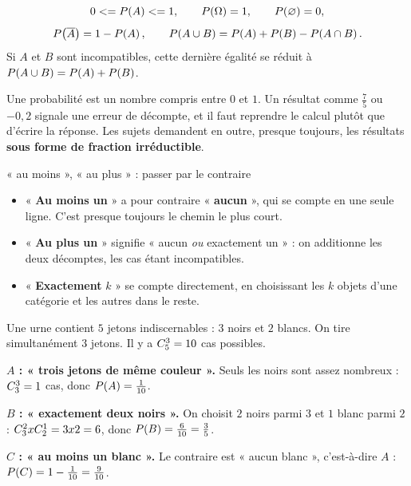 \begin{propriete}
\[
  0 \leq \proba{A} \leq 1, \qquad \proba{\Omega} = 1, \qquad
  \proba{\varnothing} = 0,
\]
\[
  \proba{\evtc{A}} = 1-\proba{A}, \qquad
  \proba{A \cup B} = \proba{A}+\proba{B}-\proba{A \cap B} .
\]
Si $A$ et $B$ sont incompatibles, cette dernière égalité se réduit à
$\proba{A \cup B} = \proba{A}+\proba{B}$.
\end{propriete}

\begin{avertissement}
Une probabilité est un nombre compris entre $0$ et $1$. Un résultat comme
$\frac{7}{5}$ ou $-0{,}2$ signale une erreur de décompte, et il faut
reprendre le calcul plutôt que d'écrire la réponse. Les sujets demandent en
outre, presque toujours, les résultats \textbf{sous forme de fraction
irréductible}.
\end{avertissement}

\begin{methode}{« au moins », « au plus » : passer par le contraire}
\begin{itemize}[leftmargin=1.3em, itemsep=0.2em]
  \item « \textbf{Au moins un} » a pour contraire « \textbf{aucun} », qui se
        compte en une seule ligne. C'est presque toujours le chemin le plus
        court.
  \item « \textbf{Au plus un} » signifie « aucun \emph{ou} exactement un » :
        on additionne les deux décomptes, les cas étant incompatibles.
  \item « \textbf{Exactement} $k$ » se compte directement, en choisissant
        les $k$ objets d'une catégorie et les autres dans le reste.
\end{itemize}
\end{methode}

\begin{exemple}
Une urne contient $5$ jetons indiscernables : $3$ noirs et $2$ blancs. On
tire simultanément $3$ jetons. Il y a $\combi{3}{5} = 10$ cas possibles.

\textbf{$A$ : « trois jetons de même couleur ».} Seuls les noirs sont assez
nombreux : $\combi{3}{3} = 1$ cas, donc $\proba{A} = \frac{1}{10}$.

\textbf{$B$ : « exactement deux noirs ».} On choisit $2$ noirs parmi $3$ et
$1$ blanc parmi $2$ : $\combi{2}{3}\times\combi{1}{2} = 3\times2 = 6$, donc
$\proba{B} = \frac{6}{10} = \frac35$.

\textbf{$C$ : « au moins un blanc ».} Le contraire est « aucun blanc »,
c'est-à-dire $A$ : $\proba{C} = 1-\frac{1}{10} = \frac{9}{10}$.
\end{exemple}

